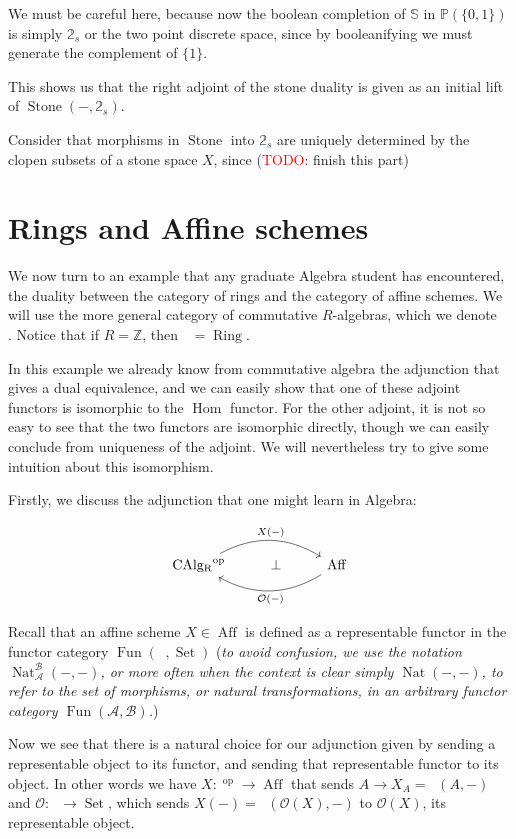 \documentclass[12pt,a4paper]{article}
\DeclareMathOperator{\Hom}{Hom}
\DeclareMathOperator{\Set}{Set}
\DeclareMathOperator{\CAlg}{CAlg_R}
\DeclareMathOperator{\CAlgZ}{CAlg_\mathbb{Z}}
\DeclareMathOperator{\Ring}{Ring}
\DeclareMathOperator{\Aff}{Aff}
\DeclareMathOperator{\Fun}{Fun}
\DeclareMathOperator{\Nat}{Nat}
\DeclareMathOperator{\op}{op}
\DeclareMathOperator{\Stone}{Stone}
\begin{document}
 We must be careful here, because now the boolean completion of $\mathbb{S}$ in $\mathbb{P}(\{0,1\})$ is simply $\mathbb{2}_s$ or the two point discrete space, since by booleanifying we must generate the complement of $\{1\}$.
 
 This shows us that the right adjoint of the stone duality is given as an initial lift of $\Stone(-, \mathbb{2}_s)$. 

Consider that morphisms in $\Stone$ into $\mathbb{2}_s$ are uniquely determined by the clopen subsets of a stone space $X$, since  (\textcolor{red}{TODO}: finish this part)



\section{Rings and Affine schemes}

We now turn to an example that any graduate Algebra student has encountered, the duality between the category of rings and the category of affine schemes. We will use the more general category of commutative $R$-algebras, which we denote $\CAlg$. Notice that if $R = \mathbb{Z}$, then $\CAlgZ = \Ring$. 

In this example we already know from commutative algebra the adjunction that gives a dual equivalence, and we can easily show that one of these adjoint functors is isomorphic to the $\Hom$ functor. For the other adjoint, it is not so easy to see that the two functors are isomorphic directly, though we can easily conclude from uniqueness of the adjoint.  We will nevertheless try to give some intuition about this isomorphism.

Firstly, we discuss the adjunction that one might learn in Algebra:

\[\begin{tikzcd}
	{\CAlg^{\op}} & \bot & {\Aff}
	\arrow["X(-)" , bend left, from=1-1, to=1-3]
	\arrow["\mathcal{O}(-)", bend left, from=1-3, to=1-1]
\end{tikzcd}\]

Recall that an affine scheme $X \in \Aff$ is defined as a representable functor in the functor category $\Fun(\CAlg, \Set)$ (\emph{to avoid confusion, we use the notation $\Nat_{\mathcal{A}}^{\mathcal{B}}(-,-)$, or more often when the context is clear simply $\Nat(-,-)$, to refer to the set of morphisms, or natural transformations, in an arbitrary functor category $\Fun(\mathcal{A},\mathcal{B})$.})

Now we see that there is a natural choice for our adjunction given by sending a representable object to its functor, and sending that representable functor to its object. In other words we have $X: \CAlg^{\op} \to \Aff$ that sends $A \to X_A = \CAlg(A, -)$ and $\mathcal{O}: \CAlg \to \Set$, which sends $X(-) = \CAlg(\mathcal{O}(X), -)$ to $\mathcal{O}(X)$, its representable object.
\end{document}
